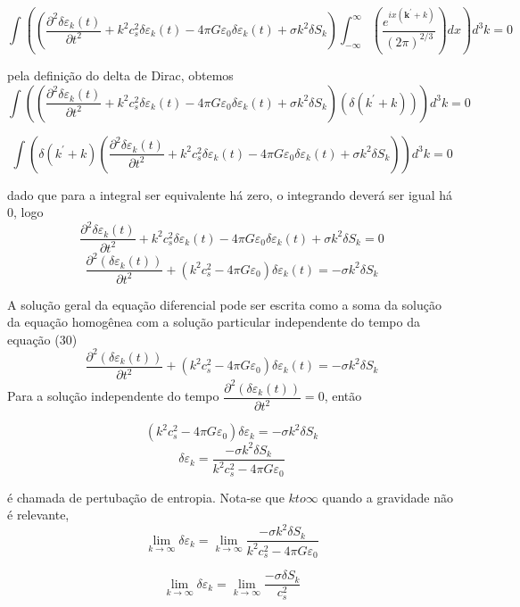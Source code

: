 \documentclass[a4paper,12pt]{article}
\begin{document}
$$ \int \left(\left( \dfrac{\partial^2 \delta\varepsilon_k (t)}{\partial t^2}+ k^2c^2_s\delta\varepsilon_k (t)- 4\pi G\varepsilon_0\delta\varepsilon_k (t) + \sigma k^2\delta S_k\right) \int^{\infty}_{-\infty} \left(\dfrac{e^{ix(\mathbf{k}^\prime +k)}}{(2\pi)^{2/3}} \right)dx  \right)d^3 k  = 0 $$

pela definição do delta de Dirac,  obtemos
$$ \int \left(\left( \dfrac{\partial^2 \delta\varepsilon_k (t)}{\partial t^2}+ k^2c^2_s\delta\varepsilon_k (t)- 4\pi G\varepsilon_0\delta\varepsilon_k (t) + \sigma k^2\delta S_k\right) (\delta (k^\prime + k))  \right)d^3 k  = 0 $$

$$ \int \left(\delta (k^\prime + k)\left( \dfrac{\partial^2 \delta\varepsilon_k (t)}{\partial t^2}+ k^2c^2_s\delta\varepsilon_k (t)- 4\pi G\varepsilon_0\delta\varepsilon_k (t) + \sigma k^2\delta S_k\right)   \right)d^3 k  = 0 $$

dado que para a integral ser equivalente há zero, o integrando deverá ser igual há 0, logo
$$\dfrac{\partial^2 \delta\varepsilon_k (t)}{\partial t^2}+ k^2c^2_s\delta\varepsilon_k (t)- 4\pi G\varepsilon_0\delta\varepsilon_k (t) + \sigma k^2\delta S_k = 0 $$
\begin{equation}
	\dfrac{\partial^2 (\delta\varepsilon_k (t))}{\partial t^2} +(k^2c^2_s - 4\pi G\varepsilon_0)\delta\varepsilon_k (t) = -\sigma k^2 \delta S_k
\end{equation} 

A solução geral da equação diferencial pode ser escrita como a soma da solução da equação homogênea com a solução particular independente do tempo da equação (30)
$$\dfrac{\partial^2 (\delta\varepsilon_k (t))}{\partial t^2} +(k^2c^2_s - 4\pi G\varepsilon_0)\delta\varepsilon_k (t) = -\sigma k^2 \delta S_k$$
Para a solução independente do tempo $\dfrac{\partial^2 (\delta\varepsilon_k (t))}{\partial t^2} = 0$, então

$$(k^2c^2_s - 4\pi G\varepsilon_0)\delta\varepsilon_k = -\sigma k^2 \delta S_k$$
\begin{equation}
	\delta\varepsilon_k  = \dfrac{ -\sigma k^2 \delta S_k}{k^2c^2_s - 4\pi G\varepsilon_0}
\end{equation}

é chamada de pertubação de entropia. Nota-se que $k to \infty$ quando a gravidade não é relevante, 
$$\lim_{k \to\infty}\delta\varepsilon_k = \lim_{k \to\infty}\dfrac{ -\sigma k^2 \delta S_k}{k^2c^2_s - 4\pi G\varepsilon_0}$$

$$\lim_{k \to\infty}\delta\varepsilon_k = \lim_{k \to\infty}\dfrac{ -\sigma \delta S_k}{c^2_s}$$
\end{document}
